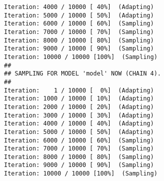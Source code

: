 \documentclass{article}\usepackage[]{graphicx}\usepackage[]{color}
\makeatletter
\newenvironment{kframe}{%
 \def\at@end@of@kframe{}%
 \ifinner\ifhmode%
  \def\at@end@of@kframe{\end{minipage}}%
  \begin{minipage}{\columnwidth}%
 \fi\fi%
 \def\FrameCommand##1{\hskip\@totalleftmargin \hskip-\fboxsep
 \colorbox{shadecolor}{##1}\hskip-\fboxsep
     \hskip-\linewidth \hskip-\@totalleftmargin \hskip\columnwidth}%
 \MakeFramed {\advance\hsize-\width
   \@totalleftmargin\z@ \linewidth\hsize
   \@setminipage}}%
 {\par\unskip\endMakeFramed%
 \at@end@of@kframe}
\newenvironment{knitrout}{}{} %
\makeatother
\begin{document}
\begin{knitrout}
\begin{kframe}
\begin{verbatim}
Iteration: 4000 / 10000 [ 40%]  (Adapting)
Iteration: 5000 / 10000 [ 50%]  (Adapting)
Iteration: 6000 / 10000 [ 60%]  (Sampling)
Iteration: 7000 / 10000 [ 70%]  (Sampling)
Iteration: 8000 / 10000 [ 80%]  (Sampling)
Iteration: 9000 / 10000 [ 90%]  (Sampling)
Iteration: 10000 / 10000 [100%]  (Sampling)
## 
## SAMPLING FOR MODEL 'model' NOW (CHAIN 4).
## 
Iteration:    1 / 10000 [  0%]  (Adapting)
Iteration: 1000 / 10000 [ 10%]  (Adapting)
Iteration: 2000 / 10000 [ 20%]  (Adapting)
Iteration: 3000 / 10000 [ 30%]  (Adapting)
Iteration: 4000 / 10000 [ 40%]  (Adapting)
Iteration: 5000 / 10000 [ 50%]  (Adapting)
Iteration: 6000 / 10000 [ 60%]  (Sampling)
Iteration: 7000 / 10000 [ 70%]  (Sampling)
Iteration: 8000 / 10000 [ 80%]  (Sampling)
Iteration: 9000 / 10000 [ 90%]  (Sampling)
Iteration: 10000 / 10000 [100%]  (Sampling)
\end{verbatim}
\end{kframe}
\end{knitrout}
\end{document}
